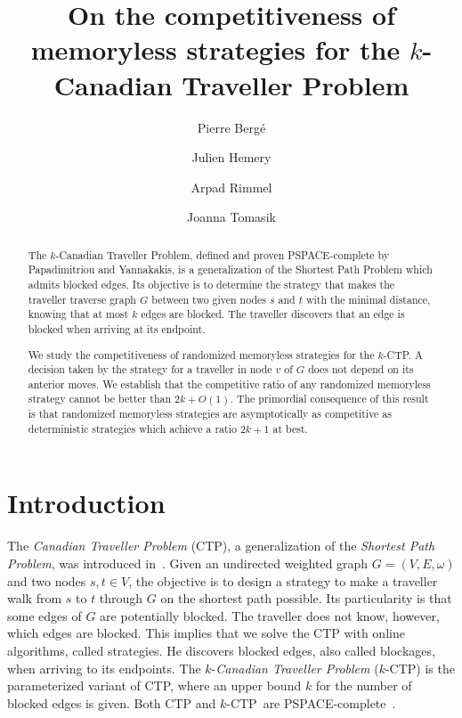 \documentclass[preprint]{elsarticle}
\newcommand{\kctp}{$k$-CTP}
\begin{document}
\title{On the competitiveness of memoryless strategies for the $k$-Canadian Traveller Problem}
\author[upsud]{Pierre Berg\'e }
\author[cs]{Julien Hemery}
\author[cs]{Arpad Rimmel}
\author[cs]{Joanna Tomasik}
\address[upsud]{LRI, Universit\'e Paris-Sud, Universit\'e Paris-Saclay, 91405 Orsay Cedex, France}
\address[cs]{LRI, CentraleSup\' elec, Universit\'e Paris-Saclay, 91405 Orsay Cedex, France}

\begin{abstract}
The $k$-Canadian Traveller Problem, defined and proven PSPACE-complete by Papadimitriou and Yannakakis, is a generalization of the Shortest Path Problem which admits blocked edges. Its objective is to determine the strategy that makes the traveller traverse graph $G$ between two given nodes $s$ and $t$ with the minimal distance, knowing that at most $k$ edges are blocked. The traveller discovers that an edge is blocked when arriving at its endpoint. 
 
We study the competitiveness of randomized memoryless strategies for the \kctp . A decision taken by the strategy for a traveller in node $v$ of $G$ does not depend on its anterior moves. We establish that the competitive ratio of any randomized memoryless strategy cannot be better than $2k + O\left(1\right)$. The primordial consequence of this result is that randomized memoryless strategies are asymptotically as competitive as deterministic strategies which achieve a ratio $2k+1$ at best. 
\end{abstract}

\maketitle


\section{Introduction}

The \textit{Canadian Traveller Problem} (CTP), a generalization of the \textit{Shortest Path Problem}, was introduced in~\cite{PaYa91}. Given an undirected weighted graph $G=(V,E,\omega)$ and two nodes $s,t \in V$, the objective is to design a strategy to make a traveller walk from $s$ to $t$ through $G$ on the shortest path possible. Its particularity is that some edges of $G$ are potentially blocked. The traveller does not know, however, which edges are blocked. This implies that we solve the CTP with online algorithms, called strategies. He discovers blocked edges, also called blockages, when arriving to its endpoints. The $k$-\textit{Canadian Traveller Problem} (\kctp) is the parameterized variant of CTP, where an upper bound $k$ for the number of blocked edges is given. Both CTP and \kctp ~are PSPACE-complete~\cite{BaSc91,PaYa91}.
\end{document}
